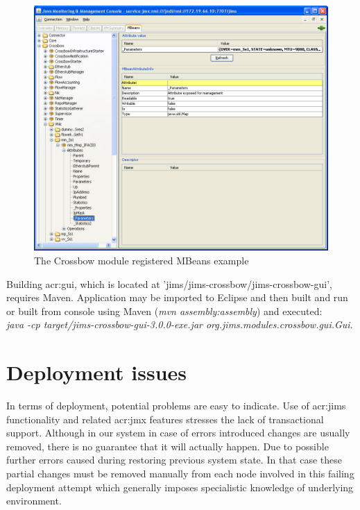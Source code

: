 \documentclass[11pt,openany]{book}
\begin{document}
      \begin{figure}[H]
        \centering
        \includegraphics[width=1.0\textwidth]{img/impl/jconsole.png}

        \caption{The Crossbow module registered MBeans example}
        \label{fig:impl:xbow-jconsole}
      \end{figure}

      Building \gls{acr:gui}, which is located at 'jims/jims-crossbow/jims-crossbow-gui', requires Maven.
      Application may be imported to Eclipse and then built and run or built from console using Maven (\textit{mvn
      assembly:assembly}) and executed: \\
	\textit{java -cp target/jims-crossbow-gui-3.0.0-exe.jar org.jims.modules.crossbow.gui.Gui}.


    \section{Deployment issues}
    \label{sec:impl:problems}
		
		In terms of deployment, potential problems are easy to indicate. Use of \gls{acr:jims} functionality and related \gls{acr:jmx} 
		features stresses the lack of transactional support. Although in our system in case of errors introduced changes
		are usually removed, there is no guarantee that it will actually happen. Due to possible further errors caused during 
		restoring previous system state. In that case these partial changes must be removed manually from each node
		involved in this failing deployment attempt which generally imposes specialistic knowledge of underlying
		environment.
\end{document}
